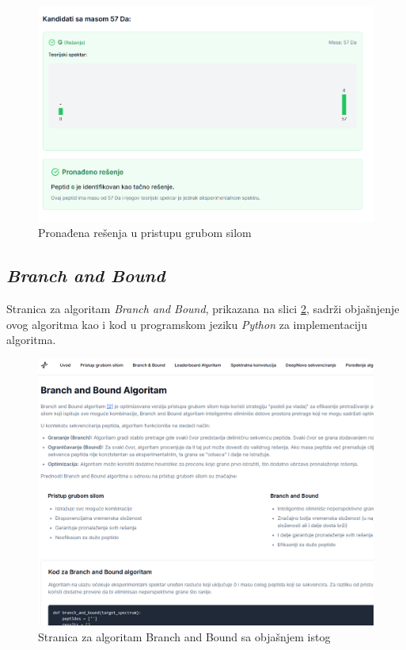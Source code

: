 \documentclass[12pt,oneside]{memoir}
\begin{document}
\begin{figure}[H]
\centering
\includegraphics[width=1\textwidth]{images/brute_force_3.png}
\caption{Pronađena rešenja u pristupu grubom silom}
\label{fig:brute_force_3}
\end{figure}

\subsection{\emph{Branch and Bound}}
Stranica za algoritam \emph{Branch and Bound}, prikazana na slici \ref{fig:branch_and_bound}, sadrži objašnjenje ovog algoritma kao i kod u programskom jeziku \emph{Python} za implementaciju algoritma.
\begin{figure}[h]
\centering
\includegraphics[width=1\textwidth]{images/branch_and_bound.png}
\caption{Stranica za algoritam Branch and Bound sa objašnjem istog}
\label{fig:branch_and_bound}
\end{figure}
\end{document}

